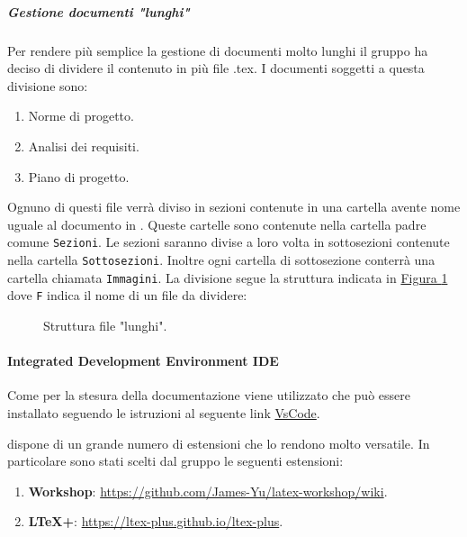 \subparagraph{Gestione documenti "lunghi"}
Per rendere più semplice la gestione di documenti molto lunghi il gruppo ha deciso di dividere il contenuto in più file .tex.
I documenti soggetti a questa divisione sono:
\begin{enumerate}
    \item Norme di progetto.
    \item Analisi dei requisiti.
    \item Piano di progetto.
\end{enumerate}
Ognuno di questi file verrà diviso in sezioni contenute in una cartella avente nome uguale al documento in .
Queste cartelle sono contenute nella cartella padre comune \texttt{Sezioni}.
Le sezioni saranno divise a loro volta in sottosezioni contenute nella cartella \texttt{Sottosezioni}.
Inoltre ogni cartella di sottosezione conterrà una cartella chiamata \texttt{Immagini}.
La divisione segue la struttura indicata in \hyperref[fig:struttura_file_lungi]{Figura \ref{fig:struttura_file_lungi}} dove \texttt{F} indica il nome di un file da dividere:

\begin{figure}[H]
    \caption{Struttura file "lunghi".}
    \label{fig:struttura_file_lungi}
\end{figure}


\paragraph{Integrated Development Environment IDE}
\label{par:IDE}
Come  per la stesura della documentazione viene utilizzato  che può essere installato seguendo le istruzioni al seguente link \href{https://code.visualstudio.com/docs/setup/windows}{VsCode}.

 dispone di un grande numero di estensioni che lo rendono molto versatile.
In particolare sono stati scelti dal gruppo le seguenti estensioni:
\begin{enumerate}
    \item \textbf{ Workshop}: \href{https://github.com/James-Yu/latex-workshop/wiki}{https://github.com/James-Yu/latex-workshop/wiki}.
    \item \textbf{LTeX+}: \href{ https://ltex-plus.github.io/ltex-plus}{ https://ltex-plus.github.io/ltex-plus}.
\end{enumerate}

